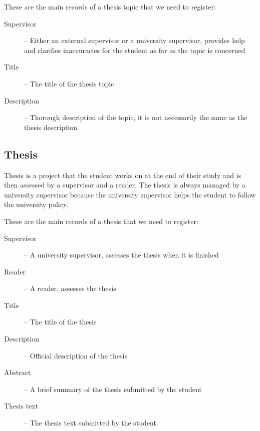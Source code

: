 These are the main records of a thesis topic that we need to register:
\begin{description}
  \item[Supervisor] -- Either an external supervisor or a university supervisor, provides help and clarifies inaccuracies for the student as far as the topic is concerned
  \item[Title] -- The title of the thesis topic
  \item[Description] -- Thorough description of the topic, it is not necessarily the same as the thesis description
\end{description}

\subsection{Thesis}

Thesis is a project that the student works on at the end of their study and is then assessed by a supervisor and a reader.
The thesis is always managed by a university supervisor because the university supervisor helps the student to follow the university policy.

These are the main records of a thesis that we need to register:
\begin{description}
  \item[Supervisor] -- A university supervisor, assesses the thesis when it is finished
  \item[Reader] -- A reader, assesses the thesis
  \item[Title] -- The title of the thesis
  \item[Description] -- Official description of the thesis
  \item[Abstract] -- A brief summary of the thesis submitted by the student
  \item[Thesis text] -- The thesis text submitted by the student
\end{description}